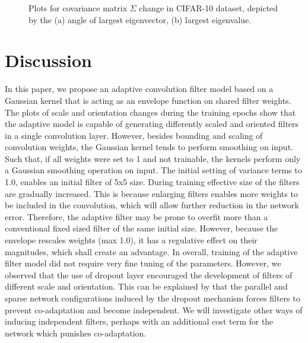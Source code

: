 \documentclass{bmvc2k}
\begin{document}
\begin{figure}
	\centering
	\caption{Plots for covariance matrix $\Sigma$ change in CIFAR-10 dataset, depicted by the (a) angle of largest eigenvector, (b) largest eigenvalue.}
	\label{fig:cifar:convchange}
\end{figure}

\section{Discussion}

In this paper, we propose an adaptive convolution filter model based on a Gaussian kernel that is acting as an envelope function on shared filter weights. The plots of scale and orientation changes during the training epochs show that the adaptive model is capable of generating differently scaled and oriented filters in a single convolution layer. However, besides bounding and scaling of convolution weights, the Gaussian kernel tends to perform smoothing on input. Such that, if all weights were set to 1 and not trainable, the kernels perform only a Gaussian smoothing operation on input. The initial setting of variance terms to 1.0, enables an initial filter of 5x5 size. During training effective size of the filters are gradually increased. This is because enlarging filters enables more weights to be included in the convolution, which will allow further reduction in the network error. Therefore, the adaptive filter may be prone to overfit more than a conventional fixed sized filter of the same initial size. However, because the envelope rescales weights (max 1.0), it has a regulative effect on their magnitudes, which shall create an advantage. In overall, training of the adaptive filter model did not require very fine tuning of the parameters. However, we observed that the use of dropout layer encouraged the development of filters of different scale and orientation. This can be explained by that the parallel and sparse network configurations induced by the dropout mechanism forces filters to prevent co-adaptation and become independent. We will investigate other ways of inducing independent filters, perhaps with an additional cost term for the network which punishes co-adaptation.
\end{document}
